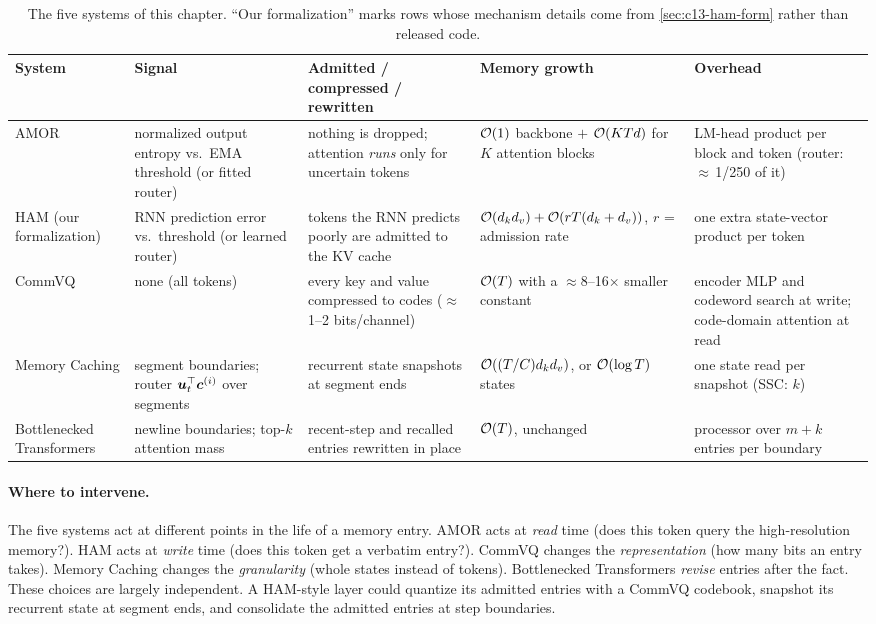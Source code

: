 \begin{table}[t]
\centering\small
\renewcommand{\arraystretch}{1.25}
\begin{tabularx}{\textwidth}{@{}>{\raggedright\arraybackslash}p{2.1cm}>{\raggedright\arraybackslash}X>{\raggedright\arraybackslash}X>{\raggedright\arraybackslash}p{2.6cm}>{\raggedright\arraybackslash}X@{}}
\toprule
System & Signal & Admitted / compressed / rewritten & Memory growth & Overhead \\
\midrule
AMOR & normalized output entropy vs.\ EMA threshold (or fitted router) & nothing is dropped; attention \emph{runs} only for uncertain tokens & $\mathcal{O}(1)$ backbone $+$ $\mathcal{O}(KTd)$ for $K$ attention blocks & LM-head product per block and token (router: $\approx$\,1/250 of it) \\
HAM (our formalization) & RNN prediction error vs.\ threshold (or learned router) & tokens the RNN predicts poorly are admitted to the KV cache & $\mathcal{O}(d_kd_v)+\mathcal{O}(rT(d_k+d_v))$, $r$ = admission rate & one extra state-vector product per token \\
CommVQ & none (all tokens) & every key and value compressed to codes ($\approx$1--2 bits/channel) & $\mathcal{O}(T)$ with a $\approx$8--16$\times$ smaller constant & encoder MLP and codeword search at write; code-domain attention at read \\
Memory Caching & segment boundaries; router $\bm{u}_t^{\top}\bm{c}^{(i)}$ over segments & recurrent state snapshots at segment ends & $\mathcal{O}((T/C)d_kd_v)$, or $\mathcal{O}(\log T)$ states & one state read per snapshot (SSC: $k$) \\
Bottlenecked Transformers & newline boundaries; top-$k$ attention mass & recent-step and recalled entries rewritten in place & $\mathcal{O}(T)$, unchanged & processor over $m+k$ entries per boundary \\
\bottomrule
\end{tabularx}
\caption{The five systems of this chapter. ``Our formalization'' marks rows whose mechanism details
come from \cref{sec:c13-ham-form} rather than released code.}
\label{tab:c13-compare}
\end{table}

\paragraph{Where to intervene.} The five systems act at different points in the life of a memory
entry. AMOR acts at \emph{read} time (does this token query the high-resolution memory?). HAM acts at
\emph{write} time (does this token get a verbatim entry?). CommVQ changes the \emph{representation} (how
many bits an entry takes). Memory Caching changes the \emph{granularity} (whole states instead of
tokens). Bottlenecked Transformers \emph{revise} entries after the fact. These choices are largely
independent. A HAM-style layer could quantize its admitted entries with a CommVQ codebook, snapshot its
recurrent state at segment ends, and consolidate the admitted entries at step boundaries.

